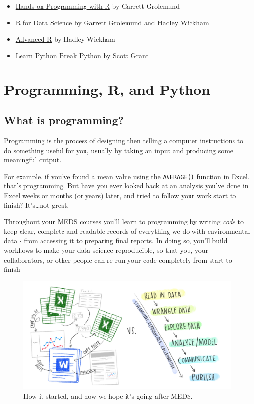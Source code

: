 \documentclass[
]{book}
\begin{document}
\begin{itemize}
\item
  \href{https://rstudio-education.github.io/hopr/}{Hands-on Programming with R} by Garrett Grolemund
\item
  \href{https://r4ds.had.co.nz/}{R for Data Science} by Garrett Grolemund and Hadley Wickham
\item
  \href{https://adv-r.hadley.nz/}{Advanced R} by Hadley Wickham
\item
  \href{https://learnpythonbreakpython.com/}{Learn Python Break Python} by Scott Grant
\end{itemize}

\hypertarget{r-py}{%
\chapter{Programming, R, and Python}\label{r-py}}

\hypertarget{what-is-programming}{%
\section{What is programming?}\label{what-is-programming}}

Programming is the process of designing then telling a computer instructions to do something useful for you, usually by taking an input and producing some meaningful output.

For example, if you've found a mean value using the \texttt{AVERAGE()} function in Excel, that's programming. But have you ever looked back at an analysis you've done in Excel weeks or months (or years) later, and tried to follow your work start to finish? It's\ldots not great.

Throughout your MEDS courses you'll learn to programming by writing \emph{code} to keep clear, complete and readable records of everything we do with environmental data - from accessing it to preparing final reports. In doing so, you'll build workflows to make your data science reproducible, so that you, your collaborators, or other people can re-run your code completely from start-to-finish.

\begin{figure}

{\centering \includegraphics[width=1\linewidth]{images/workflows} 

}

\caption{How it started, and how we hope it's going after MEDS.}\label{fig:unnamed-chunk-2}
\end{figure}
\end{document}
